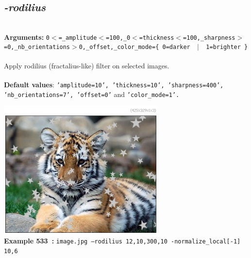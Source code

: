 \documentclass[a4paper,11pt,twoside]{book}
\begin{document}
\subsection{\emph{-rodilius} }\vspace*{-0.5em}
~\\\textbf{Arguments: } 
{\small \texttt{0$<$=\_amplitude$<$=100,\_0$<$=thickness$<$=100,\_sharpness$>$=0,\_nb\_orientations$>$0,\_offset,\_color\_mode=\{ 0=darker ~$|$~ 1=brighter \}}}\\~\\
Apply rodilius (fractalius-like) filter on selected images.
~\\~\\\textbf{Default values}: {\small \texttt{'amplitude=10', 'thickness=10', 'sharpness=400', 'nb\_orientations=7', 'offset=0'} and \texttt{'color\_mode=1'.}}
\begin{center}\includegraphics[keepaspectratio=true,height=7cm,width=\textwidth]{img/gmic_def533.jpg}\\
{\footnotesize \textbf{Example 533~:} \texttt{image.jpg --rodilius 12,10,300,10 -normalize\_local[-1] 10,6}}
\end{center}
\end{document}
